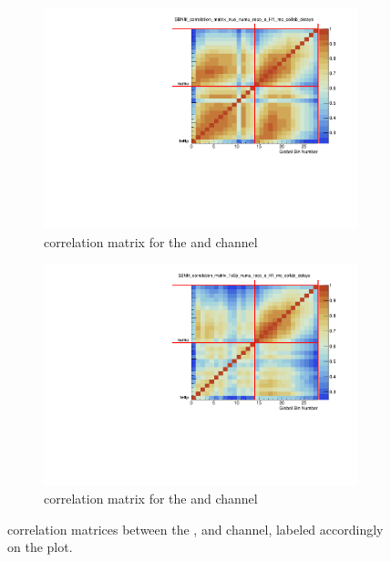 \begin{figure}[ht] 
\begin{center}
    \begin{subfigure}[b]{0.45\textwidth}
    \centering
    \includegraphics[width=1.00\textwidth]{Sensitivity/CorrelationMatrices/SBNfit_correlation_matrix_nue_numu_reco_e_H1_mc_collab_detsys_collapsed.pdf}
    \caption{correlation matrix for the \npsel and \numu channel}
    \end{subfigure}
    \begin{subfigure}[b]{0.45\textwidth}
    \centering
    \includegraphics[width=1.00\textwidth]{Sensitivity/CorrelationMatrices/SBNfit_correlation_matrix_1e0p_numu_reco_e_H1_mc_collab_detsys_collapsed.pdf}
    \caption{correlation matrix for the \zpsel and \numu channel}
    \end{subfigure}
\caption{\label{fig:bdt_corr_matrix} correlation matrices between the \npsel, \zpsel and \numu channel, labeled accordingly on the plot.}
\end{center}
\end{figure}

